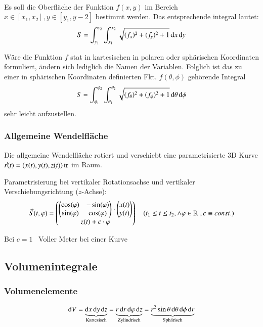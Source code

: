 \\
Es soll die Oberfläche der Funktion $ f(x, y) $ im Bereich $ x \in [x_1, x_2], y \in [y_1, y-2] $ bestimmt werden.
Das entsprechende integral lautet:
$$ S = \int_{y_1}^{y_2} \int_{x_1}^{x_2} \sqrt{(f_{x})^2 + (f_{y})^2 + 1} \mathop{} \! \mathrm{d} x \mathop{} \! \mathrm{d} y $$

Wäre die Funktion $f$ stat in kartesischen in polaren oder sphärischen Koordinaten formuliert, ändern sich lediglich die Namen der Variablen. 
Folglich ist das zu einer in sphärischen Koordinaten definierten Fkt. $f(\theta, \phi)$ gehörende Integral
$$ S = \int_{\phi_1}^{\phi_2} \int_{\theta_1}^{\theta_2} \sqrt{(f_{\theta})^2 + (f_{\phi})^2 + 1} \mathop{} \! \mathrm{d} \theta \mathop{} \! \mathrm{d} \phi $$
sehr leicht aufzustellen.


\subsubsection{Allgemeine Wendelfläche}
Die allgemeine Wendelfläche rotiert und verschiebt eine parametrisierte 3D Kurve $\vec{r}(t) = (x(t), y(t), z(t))\operatorname{tr}$ im Raum.

Parametrisierung bei vertikaler Rotationsachse und vertikaler Verschiebungsrichtung ($z$-Achse):
\[
    \vec{S}(t, \varphi) = \begin{pmatrix}
        \begin{pmatrix}
            \cos(\varphi) & -\sin(\varphi)\\
            \sin(\varphi) & \cos(\varphi)
        \end{pmatrix}
        \cdot \begin{pmatrix}
            x(t)\\
            y(t)
        \end{pmatrix}\\
        z(t) + c \cdot \varphi
    \end{pmatrix}
    \quad (t_1 \leq t \leq t_2, \land \varphi \in \mathbb{R}\;, c \equiv const.)
\]

Bei $c = 1$ \textrightarrow\ Voller Meter bei einer Kurve %



\subsection{Volumenintegrale}
\subsubsection{Volumenelemente}
$$ 
 \diff V 
    = \underbrace{\diff x \diff y \diff z}_{\text{Kartesisch}}
    = \underbrace{r \diff r \diff \varphi \diff z}_{\text{Zylindrisch}}
    = \underbrace{r^2 \sin \theta \diff \theta \diff \phi \diff r}_{\text{Sphärisch}}
$$


